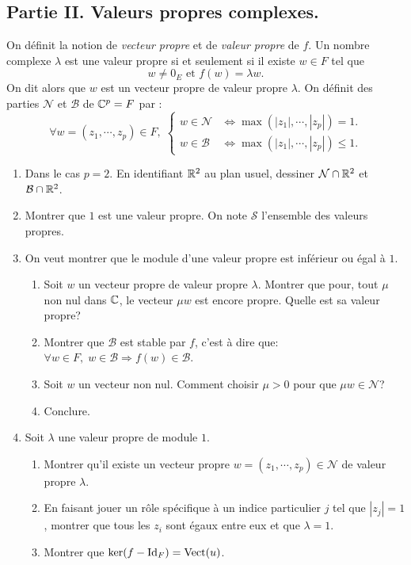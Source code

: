\subsection*{Partie II. Valeurs propres complexes.}
\noindent
On définit la notion de \emph{vecteur propre} et de \emph{valeur propre} de $f$.\newline
Un nombre complexe $\lambda$ est une valeur propre si et seulement si il existe $w\in F$ tel que 
\[
  w \neq 0_E \text{ et } f(w) = \lambda w.
\]
On dit alors que $w$ est un vecteur propre de valeur propre $\lambda$.\newline
On définit des parties $\mathcal{N}$ et $\mathcal{B}$ de $\mathbb{C}^p = F$ par :
\[
\forall w = (z_1, \cdots, z_p)\in F,\;
\left\lbrace
\begin{aligned}
 w \in \mathcal{N} &\Leftrightarrow \max(|z_1|, \cdots, |z_p|) = 1 . \\
 w \in \mathcal{B} &\Leftrightarrow \max(|z_1|, \cdots, |z_p|) \leq 1 .
\end{aligned}
\right.
\]
\begin{enumerate}
  \item Dans le cas $p=2$. En identifiant $\mathbb{R}^2$ au plan usuel, dessiner $\mathcal{N}\cap \mathbb{R}^2$ et $\mathcal{B}\cap \mathbb{R}^2$.
  
  \item Montrer que $1$ est une valeur propre. On note $\mathcal{S}$ l'ensemble des valeurs propres.
  
   \item On veut montrer que le module d'une valeur propre est inférieur ou égal à $1$.
   \begin{enumerate}
     \item Soit $w$ un vecteur propre de valeur propre $\lambda$. Montrer que pour, tout $\mu$ non nul dans $\mathbb{C}$, le vecteur $\mu w$ est encore propre. Quelle est sa valeur propre? 
     \item Montrer que $\mathcal{B}$ est stable par $f$, c'est à dire que: $\forall w \in F,\; w\in \mathcal{B} \Rightarrow f(w) \in \mathcal{B}$.
     \item Soit $w$ un vecteur non nul. Comment choisir $\mu >0$ pour que $\mu w \in \mathcal{N}$?
     \item Conclure.
   \end{enumerate}
 
 \item Soit $\lambda$ une valeur propre de module $1$.
    \begin{enumerate}
       \item Montrer qu'il existe un vecteur propre $w=(z_1,\cdots,z_p) \in \mathcal{N}$ de valeur propre $\lambda$.
       \item En faisant jouer un rôle spécifique à un indice particulier $j$ tel que $|z_j| = 1$, montrer que tous les $z_i$ sont égaux entre eux et que $\lambda = 1$.
       \item Montrer que $\ker(f - \operatorname{Id}_F) = \operatorname{Vect}(u)$.
    \end{enumerate}
\end{enumerate}

